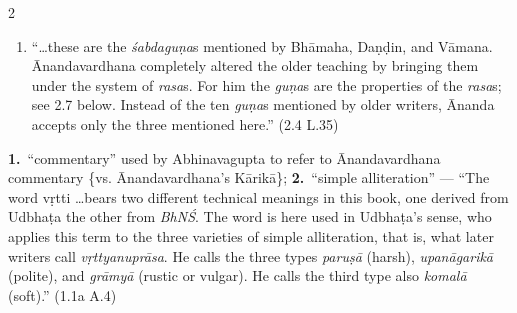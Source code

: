 \documentclass[10pt]{article}
\begin{document}
\begin{multicols}{2}
\begin{enumerate}[
			leftmargin=0em,
			rightmargin=0em,
		]
\begin{enumerate}
			\item ``\dots these are the \textit{śabdaguṇa}s mentioned by Bhāmaha, Daṇḍin, and Vāmana. Ānanda\-var\-dhana completely altered the older teaching by bringing them under the system of \textit{rasa}s. For him the \textit{guṇa}s are the properties of the \textit{rasa}s; see 2.7 below. Instead of the ten \textit{guṇa}s mentioned by older writers, Ānanda accepts only the three mentioned here.'' (2.4 L.35)
		\end{enumerate}


		 \textbf{1.}\ ``commentary'' used by Abhinavagupta to refer to Ānandavardhana commentary \{vs. Ānanda\-var\-dhana's Kārikā\};
		\textbf{2.}\ ``simple alliteration'' ---
		``The word vṛtti \dots bears two different technical meanings in this book, one derived from Udbhaṭa the other from \textit{BhNŚ}. The word is here used in Udbhaṭa's sense, who applies this term to the three varieties of simple alliteration, that is, what later writers call \textit{vṛttyanuprāsa}. He calls the three types \textit{paruṣā} (harsh), \textit{upanāgarikā} (polite), and \textit{grāmyā} (rustic or vulgar). He calls the third type also \textit{komalā} (soft).'' (1.1a A.4)

\end{enumerate}
\end{multicols}
\end{document}
